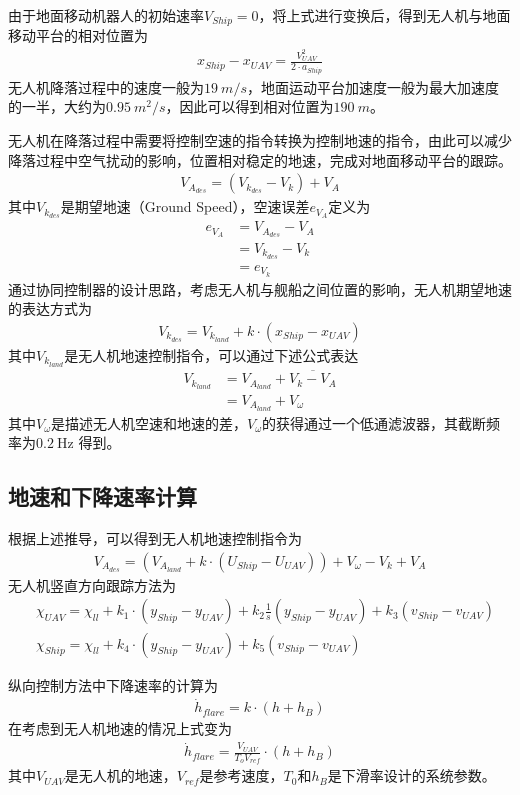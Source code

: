 由于地面移动机器人的初始速率$V_{Ship}=0$，将上式进行变换后，得到无人机与地面移动平台的相对位置为
\begin{align}
x_{Ship}-x_{UAV} = \frac{V_{UAV}^2}{2 \cdot a_{Ship}}
\end{align}
无人机降落过程中的速度一般为$19\ m/s$，地面运动平台加速度一般为最大加速度的一半，大约为$0.95\ m^2/s$，因此可以得到相对位置为$190\ m$。

无人机在降落过程中需要将控制空速的指令转换为控制地速的指令，由此可以减少降落过程中空气扰动的影响，位置相对稳定的地速，完成对地面移动平台的跟踪。
\begin{align}
V_{A_{des}} = (V_{k_{des}} -V_k) + V_A
\end{align}
其中$V_{k_{des}}$是期望地速（Ground Speed），空速误差$e_{V_A}$定义为
\begin{align}
e_{V_{A}} &= V_{A_{des}}-V_A \\
&= V_{k_{des}} - V_k \\
&= e_{V_k}
\end{align}
通过协同控制器的设计思路，考虑无人机与舰船之间位置的影响，无人机期望地速的表达方式为
\begin{align}
V_{k_{des}} = V_{k_{land}} + k \cdot (x_{Ship} - x_{UAV})
\end{align}
其中$V_{k_{land}}$是无人机地速控制指令，可以通过下述公式表达
\begin{align}
V_{k_{land}} &= V_{A_{land}} + \overline{V_k - V_A} \\
&= V_{A_{land}} + V_\omega
\end{align}
其中$V_\omega$是描述无人机空速和地速的差，$V_\omega$的获得通过一个低通滤波器，其截断频率为$0.2\ \text{Hz}$ 得到。

\subsection{地速和下降速率计算}
根据上述推导，可以得到无人机地速控制指令为
\begin{align}
V_{A_{des}} =( V_{A_{land}} + k \cdot (U_{Ship} - U_{UAV})) + V_\omega - V_k + V_A
\end{align}
无人机竖直方向跟踪方法为
\begin{align}
&\chi_{UAV} = \chi_{ll} + k_1 \cdot (y_{Ship} - y_{UAV}) +k_2 \frac{1}{s} (y_{Ship} - y_{UAV}) + k_3 (v_{Ship} - v_{UAV}) \\
&\chi_{Ship} = \chi_{ll} + k_4 \cdot (y_{Ship} - y_{UAV}) +  k_5 (v_{Ship} - v_{UAV})
\end{align}

纵向控制方法中下降速率的计算为
\begin{align}
\dot{h}_{flare} = k \cdot (h + h_B)
\end{align}
在考虑到无人机地速的情况上式变为
\begin{align}
\dot{h}_{flare} = \frac{V_{UAV}}{T_o V_{ref}} \cdot (h + h_B)
\end{align}
其中$V_{UAV}$是无人机的地速，$V_{ref}$是参考速度，$T_0$和$h_B$是下滑率设计的系统参数。

